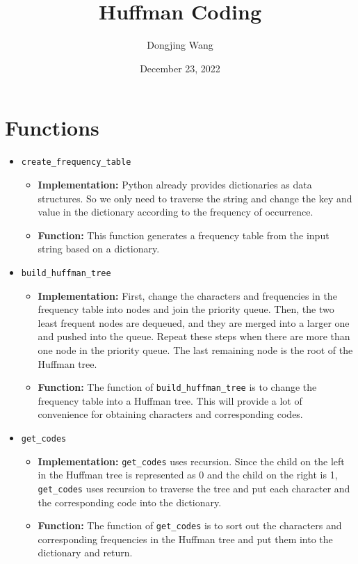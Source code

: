 \documentclass{article}
\title{Huffman Coding}
\author{Dongjing Wang}
\date{December 23, 2022}
\begin{document}
\maketitle

\section{Functions}
\begin{itemize}
    \item \texttt{create\_frequency\_table}
        \begin {itemize}
            \item \textbf{Implementation:} Python already provides dictionaries as data structures. So we only need to traverse the string and change the key and value in the dictionary according to the frequency of occurrence.
            \item \textbf{Function:} This function generates a frequency table from the input string based on a dictionary.
        \end{itemize}
    \item \texttt{build\_huffman\_tree}
        \begin {itemize}
            \item \textbf{Implementation:} First, change the characters and frequencies in the frequency table into nodes and join the priority queue. Then, the two least frequent nodes are dequeued, and they are merged into a larger one and pushed into the queue. Repeat these steps when there are more than one node in the priority queue. The last remaining node is the root of the Huffman tree.
            \item \textbf{Function:} The function of \texttt{build\_huffman\_tree} is to change the frequency table into a Huffman tree. This will provide a lot of convenience for obtaining characters and corresponding codes.
        \end{itemize}
    \item \texttt{get\_codes}
        \begin {itemize}
            \item \textbf{Implementation:} \texttt{get\_codes} uses recursion. Since the child on the left in the Huffman tree is represented as 0 and the child on the right is 1, \texttt{get\_codes} uses recursion to traverse the tree and put each character and the corresponding code into the dictionary.
            \item \textbf{Function:} The function of \texttt{get\_codes} is to sort out the characters and corresponding frequencies in the Huffman tree and put them into the dictionary and return.

\end{itemize}
\end{itemize}
\end{document}

